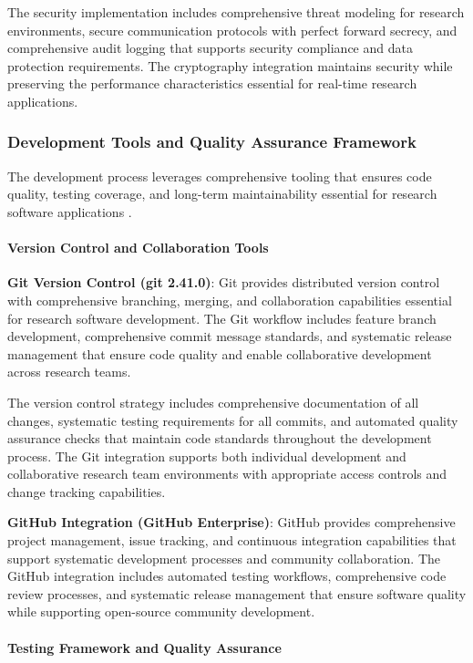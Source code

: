 \documentclass[11pt,a4paper]{article}
\begin{document}
The security implementation includes comprehensive threat modeling for research environments, secure communication
protocols with perfect forward secrecy, and comprehensive audit logging that supports security compliance and data
protection requirements. The cryptography integration maintains security while preserving the performance
characteristics essential for real-time research applications.

\subsubsection{Development Tools and Quality Assurance Framework}

The development process leverages comprehensive tooling that ensures code quality, testing coverage, and long-term
maintainability essential for research software applications .

\paragraph{Version Control and Collaboration Tools}

\textbf{Git Version Control (git 2.41.0)}: Git provides distributed version control with comprehensive branching, merging,
and collaboration capabilities essential for research software development. The Git workflow includes feature branch
development, comprehensive commit message standards, and systematic release management that ensure code quality and
enable collaborative development across research teams.

The version control strategy includes comprehensive documentation of all changes, systematic testing requirements for
all commits, and automated quality assurance checks that maintain code standards throughout the development process. The
Git integration supports both individual development and collaborative research team environments with appropriate
access controls and change tracking capabilities.

\textbf{GitHub Integration (GitHub Enterprise)}: GitHub provides comprehensive project management, issue tracking, and
continuous integration capabilities that support systematic development processes and community collaboration. The
GitHub integration includes automated testing workflows, comprehensive code review processes, and systematic release
management that ensure software quality while supporting open-source community development.

\paragraph{Testing Framework and Quality Assurance}
\end{document}
